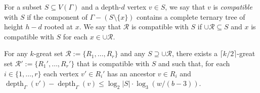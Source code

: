 \documentclass{patmorin}
\newcommand{\defin}[1]{\emph{\color{brightmaroon}#1}}
\DeclareMathOperator{\depth}{depth}
\begin{document}
For a subset $S\subseteq V(\Gamma)$ and a depth-$d$ vertex $v\in S$, we say that $v$ is \defin{compatible} with $S$ if the component of $\Gamma-(S\setminus\{x\})$ contains a complete ternary tree of height $h-d$ rooted at $x$.  We say that $\mathcal{R}$ is compatible with $S$ if $\cup\mathcal{R}\subseteq S$ and $x$ is compatible with $S$ for each $x\in\cup\mathcal{R}$.  


\begin{lem}\label{compatible_set}
  For any $k$-great set $\mathcal{R}:=\{R_1,\ldots,R_r\}$ and any $S\supseteq \cup\mathcal{R}$, there exists a $\lceil k/2\rceil$-great set $\mathcal{R}':=\{R_1',\ldots,R_r'\}$ that is compatible with $S$ and such that, for each $i\in\{1,\ldots,r\}$ each vertex $v'\in R_i'$ has an ancestor $v\in R_i$ and $\depth_{\Gamma}(v')-\depth_{\Gamma}(v) \le \log_2|S|\cdot\log_3(w/(b-3))$.
\end{lem}
\end{document}
